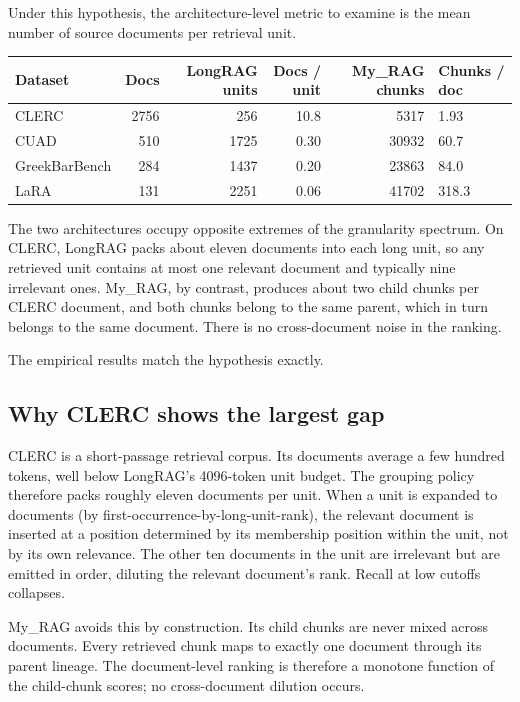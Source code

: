 \documentclass[11pt,a4paper]{article}
\begin{document}
Under this hypothesis, the architecture-level metric to examine is
the mean number of source documents per retrieval unit.

\begin{center}
\small
\begin{tabular}{l r r r r}
\toprule
\textbf{Dataset} & \textbf{Docs} & \textbf{LongRAG units}
  & \textbf{Docs / unit} & \textbf{My\_RAG chunks}
  & \textbf{Chunks / doc} \\
\midrule
CLERC              & \num{2756} & \num{256}   & \num{10.8} & \num{5317}   & \num{1.93} \\
CUAD               & \num{510}  & \num{1725}  & \num{0.30} & \num{30932}  & \num{60.7} \\
GreekBarBench      & \num{284}  & \num{1437}  & \num{0.20} & \num{23863}  & \num{84.0} \\
LaRA               & \num{131}  & \num{2251}  & \num{0.06} & \num{41702}  & \num{318.3} \\
\bottomrule
\end{tabular}
\end{center}

The two architectures occupy opposite extremes of the granularity
spectrum. On CLERC, LongRAG packs about eleven documents into each
long unit, so any retrieved unit contains at most one relevant
document and typically nine irrelevant ones. My\_RAG, by contrast,
produces about two child chunks per CLERC document, and both chunks
belong to the same parent, which in turn belongs to the same
document. There is no cross-document noise in the ranking.

The empirical results match the hypothesis exactly.

\subsection{Why CLERC shows the largest gap}
CLERC is a short-passage retrieval corpus. Its documents average a
few hundred tokens, well below LongRAG's \SI{4096}{}-token unit
budget. The grouping policy therefore packs roughly eleven documents
per unit. When a unit is expanded to documents (by
first-occurrence-by-long-unit-rank), the relevant document is
inserted at a position determined by its membership position within
the unit, not by its own relevance. The other ten documents in the
unit are irrelevant but are emitted in order, diluting the relevant
document's rank. Recall at low cutoffs collapses.

My\_RAG avoids this by construction. Its child chunks are never
mixed across documents. Every retrieved chunk maps to exactly one
document through its parent lineage. The document-level ranking is
therefore a monotone function of the child-chunk scores; no
cross-document dilution occurs.
\end{document}
